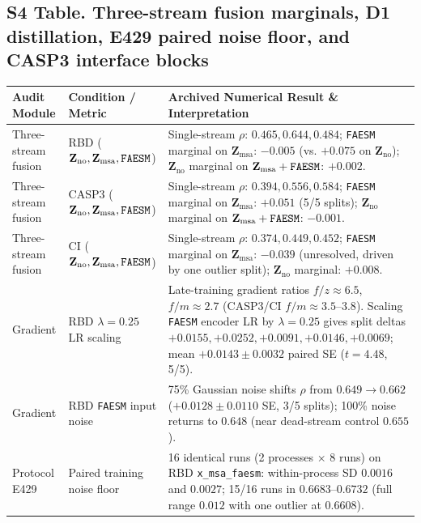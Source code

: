 \documentclass[10pt,a4paper]{article}
\begin{document}
\newpage
\subsection*{S4 Table. Three-stream fusion marginals, D1 distillation, E429 paired noise floor, and CASP3 interface blocks}
\begin{table}[!ht]
\centering
\scriptsize
\begin{tabularx}{\textwidth}{l l Y}
\toprule
\textbf{Audit Module} & \textbf{Condition / Metric} & \textbf{Archived Numerical Result \& Interpretation} \\
\midrule
Three-stream fusion & RBD ($\mathbf{Z}_{\mathrm{no}}, \mathbf{Z}_{\mathrm{msa}}, \text{\texttt{FAESM}}$) & Single-stream $\rho$: $0.465, 0.644, 0.484$; \texttt{FAESM} marginal on $\mathbf{Z}_{\mathrm{msa}}$: $-0.005$ (vs. $+0.075$ on $\mathbf{Z}_{\mathrm{no}}$); $\mathbf{Z}_{\mathrm{no}}$ marginal on $\mathbf{Z}_{\mathrm{msa}}+\text{\texttt{FAESM}}$: $+0.002$. \\
Three-stream fusion & CASP3 ($\mathbf{Z}_{\mathrm{no}}, \mathbf{Z}_{\mathrm{msa}}, \text{\texttt{FAESM}}$) & Single-stream $\rho$: $0.394, 0.556, 0.584$; \texttt{FAESM} marginal on $\mathbf{Z}_{\mathrm{msa}}$: $+0.051$ (5/5 splits); $\mathbf{Z}_{\mathrm{no}}$ marginal on $\mathbf{Z}_{\mathrm{msa}}+\text{\texttt{FAESM}}$: $-0.001$. \\
Three-stream fusion & CI ($\mathbf{Z}_{\mathrm{no}}, \mathbf{Z}_{\mathrm{msa}}, \text{\texttt{FAESM}}$) & Single-stream $\rho$: $0.374, 0.449, 0.452$; \texttt{FAESM} marginal on $\mathbf{Z}_{\mathrm{msa}}$: $-0.039$ (unresolved, driven by one outlier split); $\mathbf{Z}_{\mathrm{no}}$ marginal: $+0.008$. \\
\midrule
Gradient & RBD $\lambda=0.25$ LR scaling & Late-training gradient ratios $f/z \approx 6.5$, $f/m \approx 2.7$ (CASP3/CI $f/m \approx 3.5$--$3.8$). Scaling \texttt{FAESM} encoder LR by $\lambda=0.25$ gives split deltas $+0.0155, +0.0252, +0.0091, +0.0146, +0.0069$; mean $+0.0143 \pm 0.0032$ paired SE ($t=4.48$, 5/5). \\
Gradient & RBD \texttt{FAESM} input noise & 75\% Gaussian noise shifts $\rho$ from $0.649 \rightarrow 0.662$ ($+0.0128 \pm 0.0110$ SE, 3/5 splits); 100\% noise returns to $0.648$ (near dead-stream control $0.655$). \\
Protocol E429 & Paired training noise floor & 16 identical runs (2 processes $\times$ 8 runs) on RBD \texttt{x\_msa\_faesm}: within-process SD $0.0016$ and $0.0027$; 15/16 runs in $0.6683$--$0.6732$ (full range $0.012$ with one outlier at $0.6608$). \\

\end{tabularx}
\end{table}
\end{document}
